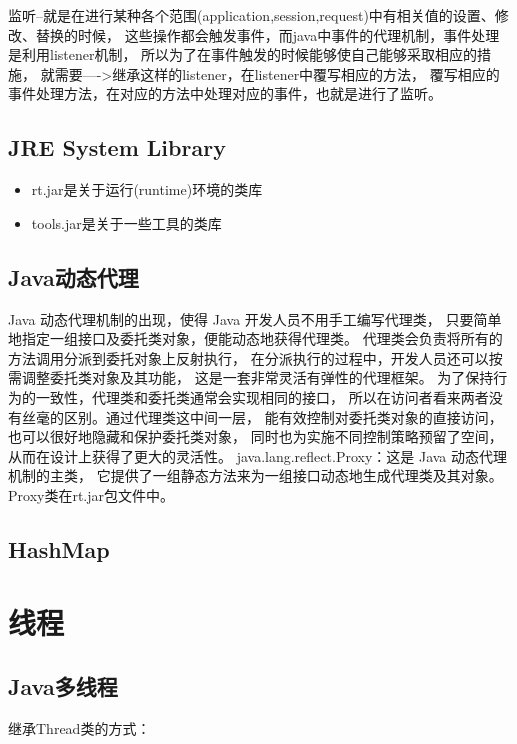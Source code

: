 \documentclass{book}
\begin{document}
监听--就是在进行某种各个范围(application,session,request)中有相关值的设置、修改、替换的时候，
这些操作都会触发事件，而java中事件的代理机制，事件处理是利用listener机制，
所以为了在事件触发的时候能够使自己能够采取相应的措施，
就需要---->继承这样的listener，在listener中覆写相应的方法，
覆写相应的事件处理方法，在对应的方法中处理对应的事件，也就是进行了监听。

\subsection{JRE System Library}

\begin{itemize}
	\item{rt.jar是关于运行(runtime)环境的类库}
	\item{tools.jar是关于一些工具的类库}
\end{itemize}

\subsection{Java动态代理}

Java 动态代理机制的出现，使得 Java 开发人员不用手工编写代理类，
只要简单地指定一组接口及委托类对象，便能动态地获得代理类。
代理类会负责将所有的方法调用分派到委托对象上反射执行，
在分派执行的过程中，开发人员还可以按需调整委托类对象及其功能，
这是一套非常灵活有弹性的代理框架。
为了保持行为的一致性，代理类和委托类通常会实现相同的接口，
所以在访问者看来两者没有丝毫的区别。通过代理类这中间一层，
能有效控制对委托类对象的直接访问，也可以很好地隐藏和保护委托类对象，
同时也为实施不同控制策略预留了空间，从而在设计上获得了更大的灵活性。
java.lang.reflect.Proxy：这是 Java 动态代理机制的主类，
它提供了一组静态方法来为一组接口动态地生成代理类及其对象。
Proxy类在rt.jar包文件中。

\subsection{HashMap}



\section{线程}

\subsection{Java多线程}

继承Thread类的方式：
\end{document}
